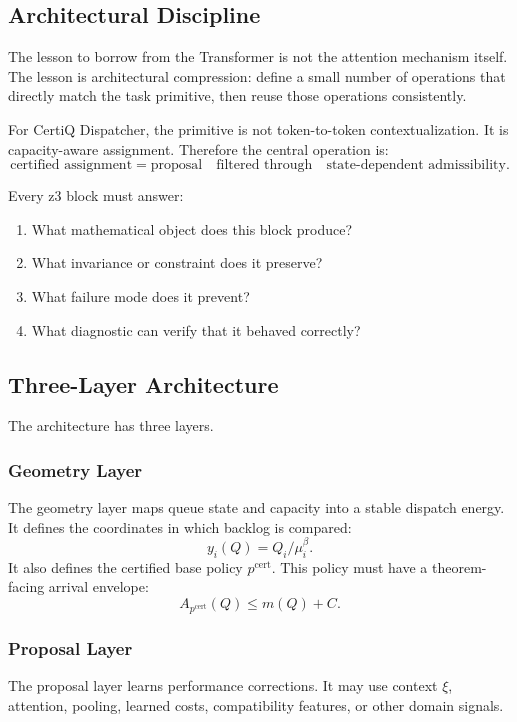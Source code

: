 \documentclass[a4paper,11pt]{article}
\theoremstyle{definition}
\begin{document}
\subsection{Architectural Discipline}

The lesson to borrow from the Transformer is not the attention mechanism
itself. The lesson is architectural compression: define a small number of
operations that directly match the task primitive, then reuse those operations
consistently.

For CertiQ Dispatcher, the primitive is not token-to-token contextualization.
It is capacity-aware assignment. Therefore the central operation is:
\[
\text{certified assignment}
=
\text{proposal}
\quad\text{filtered through}\quad
\text{state-dependent admissibility}.
\]

Every z3 block must answer:
\begin{enumerate}
  \item What mathematical object does this block produce?
  \item What invariance or constraint does it preserve?
  \item What failure mode does it prevent?
  \item What diagnostic can verify that it behaved correctly?
\end{enumerate}

\subsection{Three-Layer Architecture}

The architecture has three layers.

\subsubsection{Geometry Layer}

The geometry layer maps queue state and capacity into a stable dispatch energy.
It defines the coordinates in which backlog is compared:
\[
y_i(Q)=Q_i/\mu_i^\beta.
\]
It also defines the certified base policy \(p^{\mathrm{cert}}\). This policy
must have a theorem-facing arrival envelope:
\[
A_{p^{\mathrm{cert}}}(Q)\le m(Q)+C.
\]

\subsubsection{Proposal Layer}

The proposal layer learns performance corrections. It may use context
\(\xi\), attention, pooling, learned costs, compatibility features, or other
domain signals.
\end{document}
